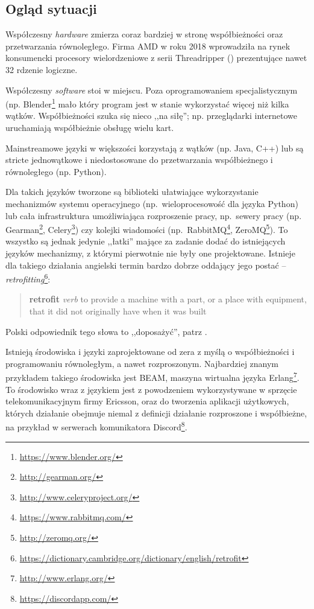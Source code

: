 \subsection{Ogląd sytuacji}

Współczesny \emph{hardware} zmierza coraz bardziej w stronę współbieżności oraz
przetwarzania równoległego.  Firma AMD w roku 2018 wprowadziła na rynek
konsumencki procesory wielordzeniowe z serii Threadripper
(\cite{AmdProductThreadripper}) prezentujące nawet 32 rdzenie logiczne.

Współczesny \emph{software} stoi w miejscu. Poza oprogramowaniem
specjalistycznym (np. Blender\footnote{\url{https://www.blender.org/}} mało
który program jest w stanie wykorzystać więcej niż kilka wątków. Współbieżności
szuka się nieco ,,na siłę''; np. przeglądarki internetowe uruchamiają
współbieżnie obsługę wielu kart.

Mainstreamowe języki w większości korzystają z wątków (np. Java, C++) lub są
stricte jednowątkowe i niedostosowane do przetwarzania współbieżnego i
równoległego (np. Python).

Dla takich języków tworzone są biblioteki ułatwiające wykorzystanie mechanizmów
systemu operacyjnego (np.~wieloprocesowość dla języka Python) lub cała
infrastruktura umożliwiająca rozproszenie pracy, np.~sewery pracy
(np. Gearman\footnote{\url{http://gearman.org/}},
Celery\footnote{\url{http://www.celeryproject.org/}}) czy kolejki wiadomości
(np.~RabbitMQ\footnote{\url{https://www.rabbitmq.com/}},
ZeroMQ\footnote{\url{http://zeromq.org/}}).
To wszystko są jednak jedynie ,,łatki'' mające za zadanie dodać do istniejących
języków mechanizmy, z którymi pierwotnie nie były one projektowane. Istnieje dla
takiego działania angielski termin bardzo dobrze oddający jego postać --
\emph{retrofitting}\footnote{\url{https://dictionary.cambridge.org/dictionary/english/retrofit}}:

\begin{quote}
    \textbf{retrofit}
    \newline
    \emph{verb}
    \newline
    to provide a machine with a part, or a place with equipment, that it did not
    originally have when it was built
\end{quote}

Polski odpowiednik tego słowa to ,,doposażyć'', patrz \cite{PWNAngielskoPolskiRetrofit}.

Istnieją środowiska i języki zaprojektowane od zera z myślą o współbieżności i
programowaniu równoległym, a nawet rozproszonym. Najbardziej znanym przykładem
takiego środowiska jest BEAM, maszyna wirtualna języka
Erlang\footnote{\url{http://www.erlang.org/}}. To środowisko wraz z językiem
jest z powodzeniem wykorzystywane w sprzęcie telekomunikacyjnym firmy Ericsson,
oraz do tworzenia aplikacji użytkowych, których działanie obejmuje niemal z
definicji działanie rozproszone i współbieżne, na przykład w serwerach
komunikatora Discord\footnote{\url{https://discordapp.com/}}.

